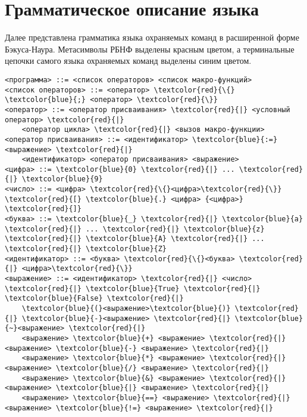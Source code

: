 \chapter{Грамматическое описание языка}\label{appendix-MikTeX-TexStudio}							%

Далее представлена грамматика языка охраняемых команд в расширенной форме Бэкуса-Наура.
Метасимволы РБНФ выделены красным цветом, а терминальные цепочки самого языка охраняемых команд
выделены синим цветом.
\begin{Verbatim}[commandchars=\\\{\}]
<программа> ::= <список операторов> <список макро-функций>
<список операторов> ::= <оператор> \textcolor{red}{\{} \textcolor{blue}{;} <оператор> \textcolor{red}{\}}
<оператор> ::= <оператор присваивания> \textcolor{red}{|} <условный оператор> \textcolor{red}{|} 
    <оператор цикла> \textcolor{red}{|} <вызов макро-функции>
<оператор присваивания> ::= <идентификатор> \textcolor{blue}{:=} <выражение> \textcolor{red}{|}
    <идентификатор> <оператор присваивания> <выражение>
<цифра> ::= \textcolor{blue}{0} \textcolor{red}{|} ... \textcolor{red}{|} \textcolor{blue}{9}
<число> ::= <цифра> \textcolor{red}{\{}<цифра>\textcolor{red}{\}} \textcolor{red}{[} \textcolor{blue}{.} <цифра> {<цифра>} \textcolor{red}{]}
<буква> ::= \textcolor{blue}{_} \textcolor{red}{|} \textcolor{blue}{a} \textcolor{red}{|} ... \textcolor{red}{|} \textcolor{blue}{z} \textcolor{red}{|} \textcolor{blue}{A} \textcolor{red}{|} ... \textcolor{red}{|} \textcolor{blue}{Z}
<идентификатор> ::= <буква> \textcolor{red}{\{}<буква> \textcolor{red}{|} <цифра>\textcolor{red}{\}}
<выражение> ::= <идентификатор> \textcolor{red}{|} <число> \textcolor{red}{|} \textcolor{blue}{True} \textcolor{red}{|} \textcolor{blue}{False} \textcolor{red}{|}
    \textcolor{blue}{(}<выражение>\textcolor{blue}{)} \textcolor{red}{|} \textcolor{blue}{-}<выражение> \textcolor{red}{|} \textcolor{blue}{~}<выражение> \textcolor{red}{|}
    <выражение> \textcolor{blue}{+} <выражение> \textcolor{red}{|} <выражение> \textcolor{blue}{-} <выражение> \textcolor{red}{|}
    <выражение> \textcolor{blue}{*} <выражение> \textcolor{red}{|} <выражение> \textcolor{blue}{/} <выражение> \textcolor{red}{|}
    <выражение> \textcolor{blue}{&} <выражение> \textcolor{red}{|} <выражение> \textcolor{blue}{|} <выражение> \textcolor{red}{|}
    <выражение> \textcolor{blue}{==} <выражение> \textcolor{red}{|} <выражение> \textcolor{blue}{!=} <выражение> \textcolor{red}{|}

\end{Verbatim}
